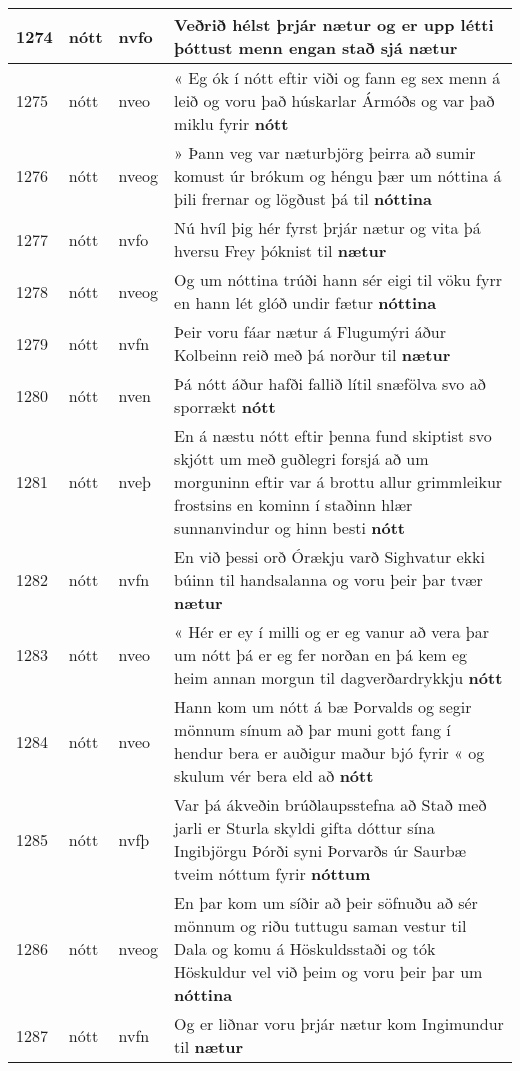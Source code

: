 \documentclass{article}
\begin{document}
\begin{longtable}{p{1cm}|p{1cm}|p{1cm}|p{13cm}}
\hline
1274&nótt&nvfo&Veðrið hélst þrjár nætur og er upp létti þóttust menn engan stað sjá \textbf{nætur} \\
\hline
1275&nótt&nveo&« Eg ók í nótt eftir viði og fann eg sex menn á leið og voru það húskarlar Ármóðs og var það miklu fyrir \textbf{nótt} \\
\hline
1276&nótt&nveog&» Þann veg var næturbjörg þeirra að sumir komust úr brókum og héngu þær um nóttina á þili frernar og lögðust þá til \textbf{nóttina} \\
\hline
1277&nótt&nvfo&Nú hvíl þig hér fyrst þrjár nætur og vita þá hversu Frey þóknist til \textbf{nætur} \\
\hline
1278&nótt&nveog&Og um nóttina trúði hann sér eigi til vöku fyrr en hann lét glóð undir fætur \textbf{nóttina} \\
\hline
1279&nótt&nvfn&Þeir voru fáar nætur á Flugumýri áður Kolbeinn reið með þá norður til \textbf{nætur} \\
\hline
1280&nótt&nven&Þá nótt áður hafði fallið lítil snæfölva svo að sporrækt \textbf{nótt} \\
\hline
1281&nótt&nveþ&En á næstu nótt eftir þenna fund skiptist svo skjótt um með guðlegri forsjá að um morguninn eftir var á brottu allur grimmleikur frostsins en kominn í staðinn hlær sunnanvindur og hinn besti \textbf{nótt} \\
\hline
1282&nótt&nvfn&En við þessi orð Órækju varð Sighvatur ekki búinn til handsalanna og voru þeir þar tvær \textbf{nætur} \\
\hline
1283&nótt&nveo&« Hér er ey í milli og er eg vanur að vera þar um nótt þá er eg fer norðan en þá kem eg heim annan morgun til dagverðardrykkju \textbf{nótt} \\
\hline
1284&nótt&nveo&Hann kom um nótt á bæ Þorvalds og segir mönnum sínum að þar muni gott fang í hendur bera er auðigur maður bjó fyrir « og skulum vér bera eld að \textbf{nótt} \\
\hline
1285&nótt&nvfþ&Var þá ákveðin brúðlaupsstefna að Stað með jarli er Sturla skyldi gifta dóttur sína Ingibjörgu Þórði syni Þorvarðs úr Saurbæ tveim nóttum fyrir \textbf{nóttum} \\
\hline
1286&nótt&nveog&En þar kom um síðir að þeir söfnuðu að sér mönnum og riðu tuttugu saman vestur til Dala og komu á Höskuldsstaði og tók Höskuldur vel við þeim og voru þeir þar um \textbf{nóttina} \\
\hline
1287&nótt&nvfn&Og er liðnar voru þrjár nætur kom Ingimundur til \textbf{nætur} \\
\hline

\end{longtable}
\end{document}

